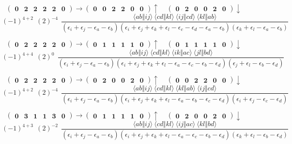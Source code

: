 \documentclass[12pt,oneside,a4paper,fleqn]{article}
\begin{document}
\[ \boldsymbol{ \begin{pmatrix} 0 & 2 & 2 & 2 & 2 & 0 \end{pmatrix} \rightarrow \begin{pmatrix} 0 & 0 & 2 & 2 & 0 & 0 \end{pmatrix} \uparrow~~~~~\begin{pmatrix} 0 & 2 & 0 & 0 & 2 & 0 \end{pmatrix} \downarrow } \]
$$(-1)^{4+2}~~(2)^{-4}~~\frac{\langle ab \Vert ij \rangle ~\langle cd \Vert kl \rangle ~\langle ij \Vert cd \rangle ~\langle kl \Vert ab \rangle }{(\epsilon_i +\epsilon_j -\epsilon_a -\epsilon_b ) (\epsilon_i +\epsilon_j +\epsilon_k +\epsilon_l -\epsilon_c -\epsilon_d -\epsilon_a -\epsilon_b ) (\epsilon_k +\epsilon_l -\epsilon_a -\epsilon_b ) }$$

\[ \boldsymbol{ \begin{pmatrix} 0 & 2 & 2 & 2 & 2 & 0 \end{pmatrix} \rightarrow \begin{pmatrix} 0 & 1 & 1 & 1 & 1 & 0 \end{pmatrix} \uparrow~~~~~\begin{pmatrix} 0 & 1 & 1 & 1 & 1 & 0 \end{pmatrix} \downarrow } \]
$$(-1)^{4+4}~~(2)^{0}~~\frac{\langle ab \Vert ij \rangle ~\langle cd \Vert kl \rangle ~\langle ik \Vert ac \rangle ~\langle jl \Vert bd \rangle }{(\epsilon_i +\epsilon_j -\epsilon_a -\epsilon_b ) (\epsilon_i +\epsilon_j +\epsilon_k +\epsilon_l -\epsilon_a -\epsilon_c -\epsilon_b -\epsilon_d ) (\epsilon_j +\epsilon_l -\epsilon_b -\epsilon_d ) }$$

\[ \boldsymbol{ \begin{pmatrix} 0 & 2 & 2 & 2 & 2 & 0 \end{pmatrix} \rightarrow \begin{pmatrix} 0 & 2 & 0 & 0 & 2 & 0 \end{pmatrix} \uparrow~~~~~\begin{pmatrix} 0 & 0 & 2 & 2 & 0 & 0 \end{pmatrix} \downarrow } \]
$$(-1)^{4+2}~~(2)^{-4}~~\frac{\langle ab \Vert ij \rangle ~\langle cd \Vert kl \rangle ~\langle kl \Vert ab \rangle ~\langle ij \Vert cd \rangle }{(\epsilon_i +\epsilon_j -\epsilon_a -\epsilon_b ) (\epsilon_i +\epsilon_j +\epsilon_k +\epsilon_l -\epsilon_a -\epsilon_b -\epsilon_c -\epsilon_d ) (\epsilon_i +\epsilon_j -\epsilon_c -\epsilon_d ) }$$

\[ \boldsymbol{ \begin{pmatrix} 0 & 3 & 1 & 1 & 3 & 0 \end{pmatrix} \rightarrow \begin{pmatrix} 0 & 1 & 1 & 1 & 1 & 0 \end{pmatrix} \uparrow~~~~~\begin{pmatrix} 0 & 2 & 0 & 0 & 2 & 0 \end{pmatrix} \downarrow } \]
$$(-1)^{4+3}~~(2)^{-2}~~\frac{\langle ab \Vert ij \rangle ~\langle cd \Vert kl \rangle ~\langle ij \Vert ac \rangle ~\langle kl \Vert bd \rangle }{(\epsilon_i +\epsilon_j -\epsilon_a -\epsilon_b ) (\epsilon_i +\epsilon_j +\epsilon_k +\epsilon_l -\epsilon_a -\epsilon_c -\epsilon_b -\epsilon_d ) (\epsilon_k +\epsilon_l -\epsilon_b -\epsilon_d ) }$$
\end{document}
